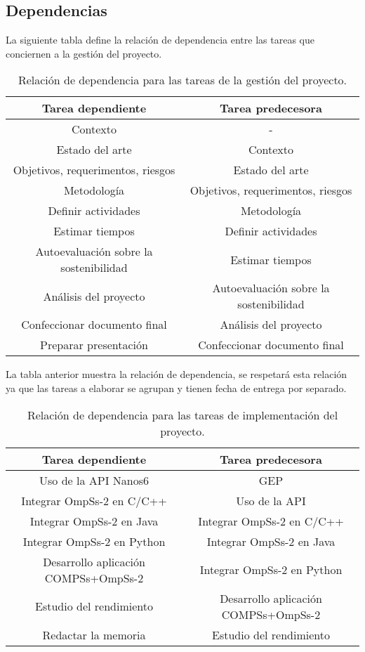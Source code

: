 \subsection{Dependencias}

La siguiente tabla define la relación de dependencia entre las tareas que conciernen a la gestión del proyecto.

\begin{table}[H]
\centering
 \begin{tabular}{||c | c||}
    \hline  
    Tarea dependiente & Tarea predecesora \\
    \hline\hline
    Contexto & - \\
    \hline
    Estado del arte & Contexto \\
    \hline
    Objetivos, requerimentos, riesgos & Estado del arte \\
    \hline
    Metodología & Objetivos, requerimentos, riesgos \\
    \hline
    Definir actividades & Metodología \\
    \hline
    Estimar tiempos & Definir actividades \\
    \hline
    Autoevaluación sobre la sostenibilidad & Estimar tiempos \\
    \hline
    Análisis del proyecto & Autoevaluación sobre la sostenibilidad \\
    \hline
    Confeccionar documento final & Análisis del proyecto \\
    \hline
    Preparar presentación & Confeccionar documento final \\
    \hline
 \end{tabular}
 \caption{Relación de dependencia para las tareas de la gestión del proyecto.}
 \label{table:1}
\end{table}

La tabla anterior muestra la relación de dependencia, se respetará esta relación ya que las tareas a elaborar se agrupan y tienen fecha de entrega por separado. 

\begin{table}[H]
 \centering
 \begin{tabular}{||c | c||}
    \hline  
    Tarea dependiente & Tarea predecesora \\
    \hline\hline
    Uso de la API Nanos6 & GEP \\
    \hline
    Integrar OmpSs-2 en C/C++ & Uso de la API \\
    \hline
    Integrar OmpSs-2 en Java & Integrar OmpSs-2 en C/C++ \\
    \hline
    Integrar OmpSs-2 en Python & Integrar OmpSs-2 en Java \\
    \hline
    Desarrollo aplicación COMPSs+OmpSs-2 & Integrar OmpSs-2 en Python \\
    \hline
    Estudio del rendimiento & Desarrollo aplicación COMPSs+OmpSs-2 \\
    \hline
    Redactar la memoria & Estudio del rendimiento \\
    \hline
 \end{tabular}
    \caption{Relación de dependencia para las tareas de implementación del proyecto.}
    \label{table:2}
\end{table}

